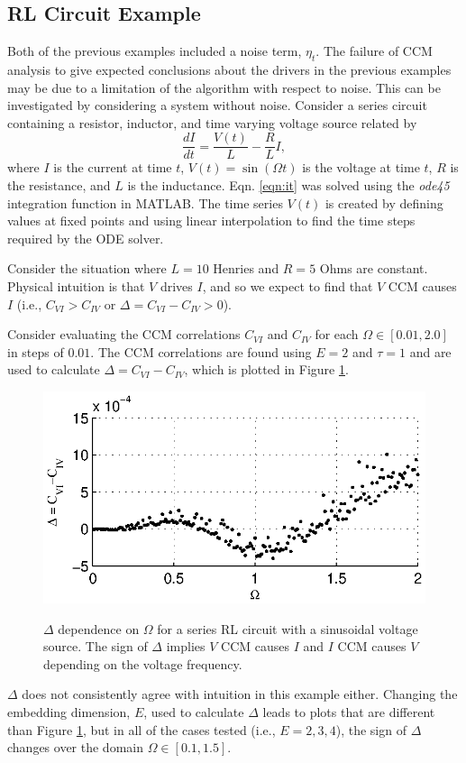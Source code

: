 \documentclass[twocolumn,aps,pre,groupedaddress]{revtex4-1}
\begin{document}
\subsection{RL Circuit Example}
\label{sec:rlcirc}
Both of the previous examples included a noise term, $\eta_t$.  The failure of CCM analysis to give expected conclusions about the drivers in the previous examples may be due to a limitation of the algorithm with respect to noise.  This can be investigated by considering a system without noise.  Consider a series circuit containing a resistor, inductor, and time varying voltage source related by
\begin{equation}
\label{eqn:it}
\frac{dI}{dt} = \frac{V(t)}{L} - \frac{R}{L} I,
\end{equation}
where $I$ is the current at time $t$, $V(t)= \sin\left(\Omega t\right)$ is the voltage at time $t$, $R$ is the resistance, and $L$ is the inductance.  Eqn. \ref{eqn:it} was solved using the {\em ode45} integration function in MATLAB.  The time series $V(t)$ is created by defining values at fixed points and using linear interpolation to find the time steps required by the ODE solver.  

Consider the situation where $L=10$ Henries and $R=5$ Ohms are constant.  Physical intuition is that $V$ drives $I$, and so we expect to find that $V$ CCM causes $I$ (i.e., $C_{VI}>C_{IV}$ or $\Delta = C_{VI}-C_{IV} > 0$). 

Consider evaluating the CCM correlations $C_{VI}$ and $C_{IV}$ for each $\Omega\in[0.01,2.0]$ in steps of $0.01$.  The CCM correlations are found using $E=2$ and $\tau=1$ and are used to calculate $\Delta = C_{VI}-C_{IV}$, which is plotted in Figure \ref{fig:Av}.
\begin{figure}[ht]
\includegraphics[scale=0.9]{RLCircuitVaryV_Freq.eps} \\
\caption{$\Delta$ dependence on $\Omega$ for a series RL circuit with a sinusoidal voltage source.  The sign of $\Delta$ implies $V$ CCM causes $I$ and $I$ CCM causes $V$ depending on the voltage frequency.}
\label{fig:Av}
\end{figure}
$\Delta$ does not consistently agree with intuition in this example either.  Changing the embedding dimension, $E$, used to calculate $\Delta$ leads to plots that are different than Figure \ref{fig:Av}, but in all of the cases tested (i.e., $E=2,3,4$), the sign of $\Delta$ changes over the domain $\Omega\in[0.1,1.5]$. 
\end{document}
